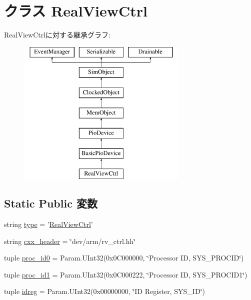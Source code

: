 \hypertarget{classRealView_1_1RealViewCtrl}{
\section{クラス RealViewCtrl}
\label{classRealView_1_1RealViewCtrl}
}
RealViewCtrlに対する継承グラフ:\begin{figure}[H]
\begin{center}
\leavevmode
\includegraphics[height=7cm]{classRealView_1_1RealViewCtrl}
\end{center}
\end{figure}
\subsection*{Static Public 変数}
\begin{DoxyCompactItemize}
\item 
string \hyperlink{classRealView_1_1RealViewCtrl_acce15679d830831b0bbe8ebc2a60b2ca}{type} = '\hyperlink{classRealView_1_1RealViewCtrl}{RealViewCtrl}'
\item 
string \hyperlink{classRealView_1_1RealViewCtrl_a17da7064bc5c518791f0c891eff05fda}{cxx\_\-header} = \char`\"{}dev/arm/rv\_\-ctrl.hh\char`\"{}
\item 
tuple \hyperlink{classRealView_1_1RealViewCtrl_a0408463a4e55d022875f21688adb407f}{proc\_\-id0} = Param.UInt32(0x0C000000, \char`\"{}Processor ID, SYS\_\-PROCID\char`\"{})
\item 
tuple \hyperlink{classRealView_1_1RealViewCtrl_a10f3e2dba94dee9578902a924571bdb5}{proc\_\-id1} = Param.UInt32(0x0C000222, \char`\"{}Processor ID, SYS\_\-PROCID1\char`\"{})
\item 
tuple \hyperlink{classRealView_1_1RealViewCtrl_aacf690a53ecbec448c90e3974c61e27c}{idreg} = Param.UInt32(0x00000000, \char`\"{}ID Register, SYS\_\-ID\char`\"{})
\end{DoxyCompactItemize}


